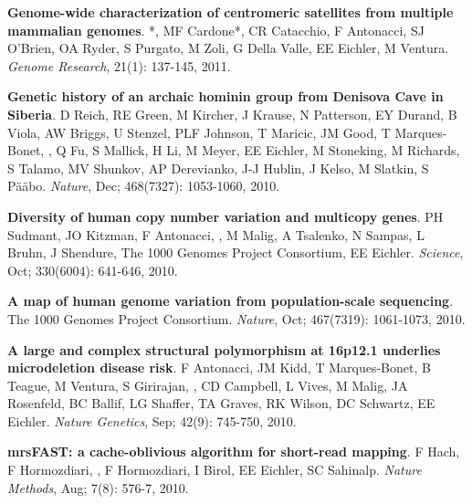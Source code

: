 \vspace{-.2cm}
    {\bf Genome-wide characterization of centromeric satellites from multiple mammalian genomes}.
    \calkan{}*, MF Cardone*, CR Catacchio, F Antonacci,
    SJ O'Brien, OA Ryder, S Purgato, M Zoli, G Della Valle, EE Eichler, M Ventura.
    {\em Genome Research}, 21(1): 137-145, 2011.
    
\vspace{-.2cm}
    {\bf Genetic history of an archaic hominin group from Denisova Cave in Siberia}.
    D Reich, RE Green, M Kircher, J Krause, 
    N Patterson, EY Durand, B Viola, AW Briggs, 
    U Stenzel, PLF Johnson, T Maricic, JM Good, 
    T Marques-Bonet, \calkan{}, Q Fu, S Mallick, H Li, 
    M Meyer, EE Eichler, M Stoneking, M Richards, 
    S Talamo, MV Shunkov, AP Derevianko, J-J Hublin, 
    J Kelso, M Slatkin, S P\"{a}\"{a}bo.
    {\em Nature}, Dec; 468(7327): 1053-1060, 2010.
    
\vspace{-.2cm}
    {\bf Diversity of human copy number variation and multicopy genes}. PH Sudmant, JO Kitzman, F Antonacci, 
    \calkan{}, M Malig, A Tsalenko, N Sampas, L Bruhn, J Shendure, The 1000 Genomes Project Consortium, EE Eichler.
    {\em Science}, Oct; 330(6004): 641-646, 2010.
    
\vspace{-.2cm}
    {\bf A map of human genome variation from population-scale sequencing}. The 1000 Genomes Project Consortium.
    {\em Nature}, Oct; 467(7319): 1061-1073, 2010.
    
\vspace{-.2cm}
    {\bf A large and complex structural polymorphism at 16p12.1 underlies microdeletion disease risk}. F Antonacci, JM Kidd,
     T Marques-Bonet, B Teague, M Ventura, S Girirajan, \calkan{}, CD Campbell, L Vives, M Malig, 
    JA Rosenfeld, BC Ballif, LG Shaffer, TA Graves, RK Wilson, DC Schwartz, EE Eichler. {\em Nature Genetics}, Sep; 42(9): 745-750, 2010.
    
\vspace{-.2cm}
    {\bf mrsFAST: a cache-oblivious algorithm for short-read mapping}. F  Hach,  F Hormozdiari, \calkan{}, F Hormozdiari,
    I Birol,  EE Eichler, SC Sahinalp. {\em Nature Methods}, Aug; 7(8): 576-7, 2010.
    
\clearpage

